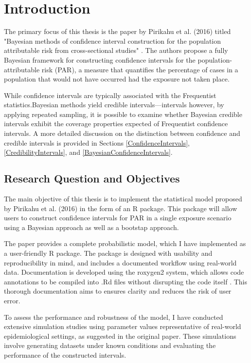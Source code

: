 \chapter{Introduction} \label{sec:Intro}

The primary focus of this thesis is the paper by Pirikahu et al. (2016) titled "Bayesian methods of confidence interval construction for the population attributable risk from cross-sectional studies" \cite{Pirikahu2016BayesianMO}. The authors propose a fully Bayesian framework for constructing confidence intervals for the population-attributable risk (PAR), a measure that quantifies the percentage of cases in a population that would not have occurred had the exposure not taken place.

While confidence intervals are typically associated with the Frequentist statistics.Bayesian methods yield credible intervals—intervals however, by applying repeated sampling, it is possible to examine whether Bayesian credible intervals exhibit the coverage properties expected of Frequentist confidence intervals. A more detailed discussion on the distinction between confidence and credible intervals is provided in Sections \ref{ConfidenceIntervals}, \ref{CredibilityIntervals}, and \ref{BayesianConfidenceIntervals}.

\section{Research Question and Objectives} \label{sec:Task}

The main objective of this thesis is to implement the statistical model proposed by Pirikahu et al. (2016) in the form of an R package. This package will allow users to construct confidence intervals for PAR in a single exposure scenario using a Bayesian approach as well as a bootstap approach.

The paper provides a complete probabilistic model, which I have implemented as a user-friendly R package. The package is designed with usability and reproducibility in mind, and includes a documented workflow using real-world data. Documentation is developed using the roxygen2 system, which allows code annotations to be compiled into .Rd files without disrupting the code itself \cite{roxygen2}. This thorough documentation aims to ensures clarity and reduces the risk of user error.

To assess the performance and robustness of the model, I have conducted extensive simulation studies using parameter values representative of real-world epidemiological settings, as suggested in the original paper. These simulations involve generating datasets under known conditions and evaluating the performance of the constructed intervals.

